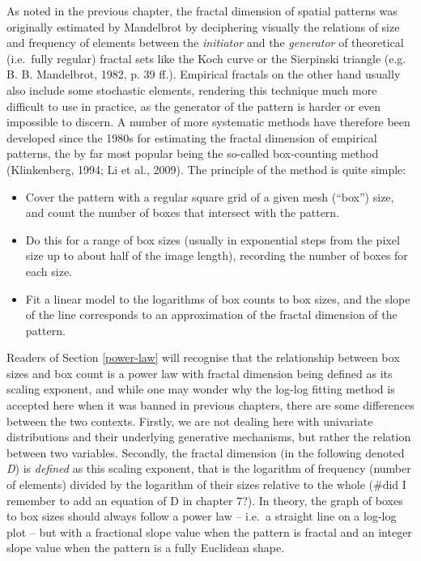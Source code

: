 \documentclass[
  12pt,
]{book}
\begin{document}
As noted in the previous chapter, the fractal dimension of spatial patterns was originally estimated by Mandelbrot by deciphering visually the relations of size and frequency of elements between the \emph{initiator} and the \emph{generator} of theoretical (i.e.~fully regular) fractal sets like the Koch curve or the Sierpinski triangle (e.g. B. B. Mandelbrot, 1982, p. 39 ff.). Empirical fractals on the other hand usually also include some stochastic elements, rendering this technique much more difficult to use in practice, as the generator of the pattern is harder or even impossible to discern. A number of more systematic methods have therefore been developed since the 1980s for estimating the fractal dimension of empirical patterns, the by far most popular being the so-called box-counting method (Klinkenberg, 1994; Li et al., 2009). The principle of the method is quite simple:

\begin{itemize}
\item
  Cover the pattern with a regular square grid of a given mesh (``box'') size, and count the number of boxes that intersect with the pattern.
\item
  Do this for a range of box sizes (usually in exponential steps from the pixel size up to about half of the image length), recording the number of boxes for each size.
\item
  Fit a linear model to the logarithms of box counts to box sizes, and the slope of the line corresponds to an approximation of the fractal dimension of the pattern.
\end{itemize}

Readers of Section \ref{power-law} will recognise that the relationship between box sizes and box count is a power law with fractal dimension being defined as its scaling exponent, and while one may wonder why the log-log fitting method is accepted here when it was banned in previous chapters, there are some differences between the two contexts. Firstly, we are not dealing here with univariate distributions and their underlying generative mechanisms, but rather the relation between two variables. Secondly, the fractal dimension (in the following denoted \emph{D}) is \emph{defined} as this scaling exponent, that is the logarithm of frequency (number of elements) divided by the logarithm of their sizes relative to the whole (\#did I remember to add an equation of D in chapter 7?). In theory, the graph of boxes to box sizes should always follow a power law -- i.e.~a straight line on a log-log plot -- but with a fractional slope value when the pattern is fractal and an integer slope value when the pattern is a fully Euclidean shape.
\end{document}
